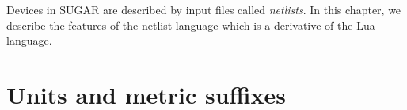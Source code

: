 

Devices in SUGAR are described by input files called \emph{netlists}.
In this chapter, we describe the features of the netlist language which is
a derivative of the Lua language.

\section{Units and metric suffixes}

